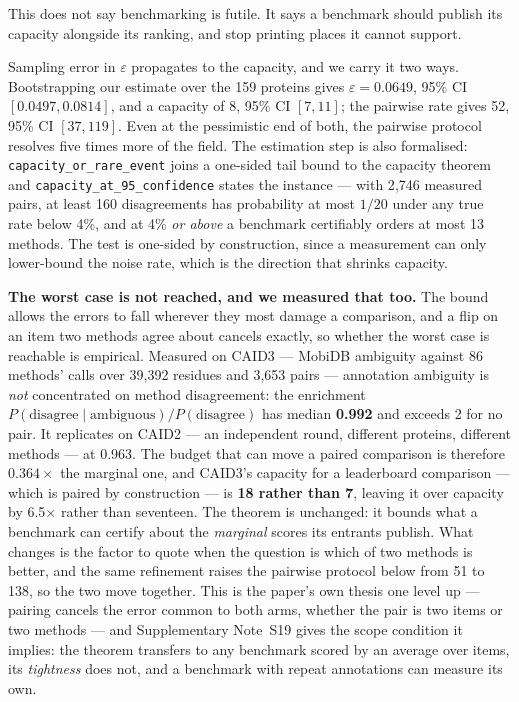 \documentclass[11pt,a4paper]{article}
\newcommand{\eps}{\varepsilon}
\newcommand{\code}[1]{\texttt{\small #1}}
\begin{document}
This does not say benchmarking is futile. It says a benchmark should publish its
capacity alongside its ranking, and stop printing places it cannot support.

Sampling error in $\eps$ propagates to the capacity, and we carry it two ways.
Bootstrapping our estimate over the 159 proteins gives $\eps = 0.0649$, 95\% CI
$[0.0497, 0.0814]$, and a capacity of 8, 95\% CI $[7, 11]$; the pairwise rate
gives 52, 95\% CI $[37, 119]$. Even at the pessimistic end of both, the pairwise
protocol resolves five times more of the field. The estimation step is also
formalised: \code{capacity\_or\_rare\_event} joins a one-sided tail bound to the
capacity theorem and \code{capacity\_at\_95\_confidence} states the instance ---
with 2{,}746 measured pairs, at least 160 disagreements has probability at most
$1/20$ under any true rate below 4\%, and at 4\% \emph{or above} a benchmark
certifiably orders at most 13 methods. The test is one-sided by construction, since a measurement
can only lower-bound the noise rate, which is the direction that shrinks
capacity.

\textbf{The worst case is not reached, and we measured that too.} The bound
allows the errors to fall wherever they most damage a comparison, and a flip on
an item two methods agree about cancels exactly, so whether the worst case is
reachable is empirical. Measured on CAID3 --- MobiDB ambiguity against 86
methods' calls over 39{,}392 residues and 3{,}653 pairs --- annotation ambiguity
is \emph{not} concentrated on method disagreement: the enrichment
$P(\text{disagree} \mid \text{ambiguous}) / P(\text{disagree})$ has median
\textbf{0.992} and exceeds 2 for no pair. It replicates on CAID2 --- an
independent round, different proteins, different methods --- at 0.963. The budget that can move a paired
comparison is therefore $0.364\times$ the marginal one, and CAID3's capacity for
a leaderboard comparison --- which is paired by construction --- is
\textbf{18 rather than 7}, leaving it over capacity by 6.5$\times$ rather than
seventeen. The theorem is unchanged: it bounds what a benchmark can certify
about the \emph{marginal} scores its entrants publish. What changes is the
factor to quote when the question is which of two methods is better, and the
same refinement raises the pairwise protocol below from 51 to 138, so the two
move together. This is the paper's own thesis one level up --- pairing cancels
the error common to both arms, whether the pair is two items or two methods ---
and Supplementary Note~S19 gives the scope condition it implies: the theorem
transfers to any benchmark scored by an average over items, its \emph{tightness}
does not, and a benchmark with repeat annotations can measure its own.
\end{document}
